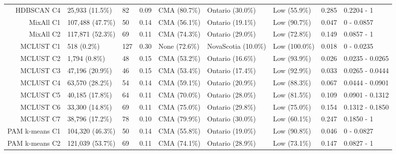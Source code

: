 \documentclass[11pt, a4paper]{article}
\begin{document}
\begin{table}[H]
{\begin{tabular}{|r|llllllll|}
\rowcolor{gray!25}  HDBSCAN C4 & 25,933 (11.5\%) & 82 & 0.09 & CMA (80.7\%) & Ontario (30.0\%) & Low (55.9\%) & 0.285 & 0.2204 - 1 \\
  MixAll C1 & 107,488 (47.7\%) & 50 & 0.14 & CMA (56.1\%) & Ontario (19.1\%) & Low (90.7\%) & 0.047 & 0 - 0.0857 \\
  MixAll C2 & 117,871 (52.3\%) & 69 & 0.11 & CMA (74.3\%) & Ontario (29.0\%) & Low (72.8\%) & 0.149 & 0.0857 - 1 \\
 \rowcolor{gray!25} MCLUST C1 & 518 (0.2\%) & 127 & 0.30 & None (72.6\%) & NovaScotia (10.0\%) & Low (100.0\%) & 0.018 & 0 - 0.0235 \\
\rowcolor{gray!25}  MCLUST C2 & 1,794 (0.8\%) & 48 & 0.15 & CMA (53.2\%) & Ontario (16.6\%) & Low (93.9\%) & 0.026 & 0.0235 - 0.0265 \\
\rowcolor{gray!25}  MCLUST C3 & 47,196 (20.9\%) & 46 & 0.15 & CMA (53.4\%) & Ontario (17.4\%) & Low (92.9\%) & 0.033 & 0.0265 - 0.0444 \\
\rowcolor{gray!25}  MCLUST C4 & 63,570 (28.2\%) & 54 & 0.14 & CMA (59.1\%) & Ontario (20.9\%) & Low (88.3\%) & 0.067 & 0.0444 - 0.0901 \\
\rowcolor{gray!25}  MCLUST C5 & 40,185 (17.8\%) & 64 & 0.11 & CMA (70.0\%) & Ontario (28.0\%) & Low (81.5\%) & 0.109 & 0.0901 - 0.1312 \\
 \rowcolor{gray!25} MCLUST C6 & 33,300 (14.8\%) & 69 & 0.11 & CMA (75.0\%) & Ontario (29.8\%) & Low (75.0\%) & 0.154 & 0.1312 - 0.1850 \\
\rowcolor{gray!25}  MCLUST C7 & 38,796 (17.2\%) & 78 & 0.10 & CMA (79.9\%) & Ontario (30.0\%) & Low (60.1\%) & 0.247 & 0.1850 - 1 \\
  PAM k-means C1 & 104,320 (46.3\%) & 50 & 0.14 & CMA (55.8\%) & Ontario (19.0\%) & Low (90.8\%) & 0.046 & 0 - 0.0827 \\
  PAM k-means C2 & 121,039 (53.7\%) & 69 & 0.11 & CMA (74.1\%) & Ontario (28.9\%) & Low (73.1\%) & 0.147 & 0.0827 - 1 \\
   \hline
\end{tabular}}
\end{table}
\end{document}
